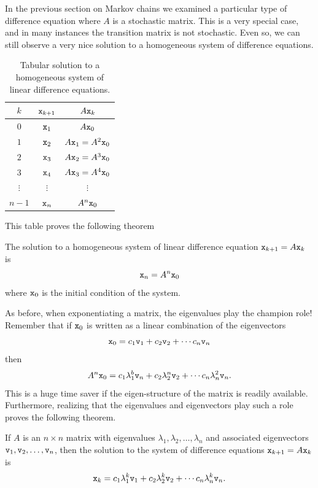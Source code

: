 In the previous section on Markov chains we examined a particular type of difference
equation where $A$ is a stochastic matrix.  This is a very special case, and in many
instances the transition matrix is not stochastic.  Even so, we can still observe a very
nice solution to a homogeneous system of difference equations.

\begin{table}[ht!]
    \centering
    \begin{tabular}{|c|c|c|}
        \hline
        $k$ & $\texttt{x}_{k+1}$ & $A \texttt{x}_{k}$ \\ \hline
        $0$ & $\texttt{x}_1$ & $A \texttt{x}_0$ \\
        $1$ & $\texttt{x}_2$ & $A \texttt{x}_1 = A^2 \texttt{x}_0$ \\
        $2$ & $\texttt{x}_3$ & $A \texttt{x}_2 = A^3 \texttt{x}_0$ \\
        $3$ & $\texttt{x}_4$ & $A \texttt{x}_3 = A^4 \texttt{x}_0$ \\
        $\vdots$ & $\vdots$ & $\vdots$ \\
        $n-1$ & $\texttt{x}_{n}$ & $A^n \texttt{x}_0$ \\ \hline
    \end{tabular}
    \caption{Tabular solution to a homogeneous system of linear difference equations.}
    \label{tab:10.8.linear_hom}
\end{table}
This table proves the following theorem

\begin{thm}\label{thm:10.8.linear_hom}
    The solution to a homogeneous system of linear difference equation $\texttt{x}_{k+1} = A
    \texttt{x}_k$ is
    \[ \texttt{x}_n = A^n \texttt{x}_0 \]
    where $\texttt{x}_0$ is the initial condition of the system.
\end{thm}

As before, when exponentiating a matrix, the eigenvalues play the champion role!  Remember
that if $\texttt{x}_0$ is written as a linear combination of the eigenvectors 
\[ \texttt{x}_0 = c_1 \texttt{v}_1 + c_2 \texttt{v}_2 + \cdots c_n \texttt{v}_n \]
then
\[ A^n \texttt{x}_0 = c_1 \lambda_1^b \texttt{v}_n + c_2 \lambda_2^n \texttt{v}_2 + \cdots c_n \lambda_n^2
    \texttt{v}_n. \]
This is a huge time saver if the eigen-structure of the matrix is readily available.
Furthermore, realizing that the eigenvalues and eigenvectors play such a role proves the
following theorem.

\begin{thm}\label{thm:linear_homog_soln}
    If $A$ is an $n \times n$ matrix with eigenvalues $\lambda_1, \lambda_2, \ldots,
    \lambda_n$ and
    associated eigenvectors $\texttt{v}_1, \texttt{v}_2, \ldots, \texttt{v}_n$, then the solution to the system
    of difference equations $\texttt{x}_{k+1} = A \texttt{x}_k$ is
    \[ \texttt{x}_k = c_1 \lambda_1^k \texttt{v}_1 + c_2 \lambda_2^k \texttt{v}_2 + \cdots c_n \lambda_n^k
        \texttt{v}_n. \]
\end{thm}

